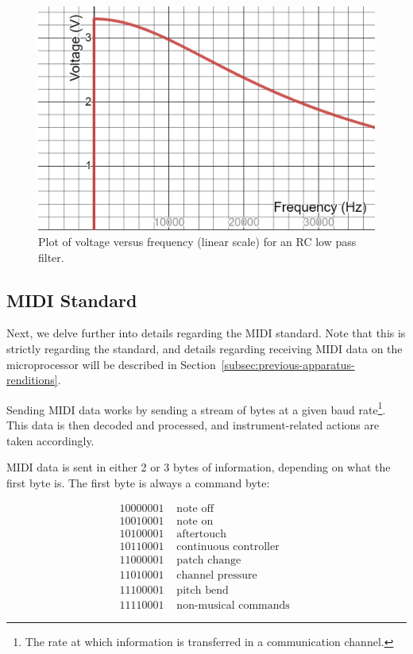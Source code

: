 \begin{figure}[H]
    \centering
    \includegraphics[width = 0.5 \textwidth]{lpfgraph}
    \caption{Plot of voltage versus frequency (linear scale) for an RC low pass filter. }
    \label{fig:lpfgraph}
\end{figure}

\subsection{MIDI Standard}\label{subsec:midi-standard-theory}

Next, we delve further into details regarding the MIDI standard.
Note that this is strictly regarding the standard, and details regarding receiving MIDI data on the microprocessor will be described in Section~\ref{subsec:previous-apparatus-renditions}.

Sending MIDI data works by sending a stream of bytes at a given baud rate\footnote{The rate at which information is transferred in a communication channel.}. %
This data is then decoded and processed, and instrument-related actions are taken accordingly. 

MIDI data is sent in either 2 or 3 bytes of information, depending on what the first byte is.
The first byte is always a command byte:

\[
\begin{array}{l|l}
10000001 & \text { note off } \\
10010001 & \text { note on } \\
10100001 & \text { aftertouch } \\
10110001 & \text { continuous controller } \\
11000001 & \text { patch change } \\
11010001 & \text { channel pressure } \\
11100001 & \text { pitch bend } \\
11110001 & \text { non-musical commands }
\end{array}
\]


